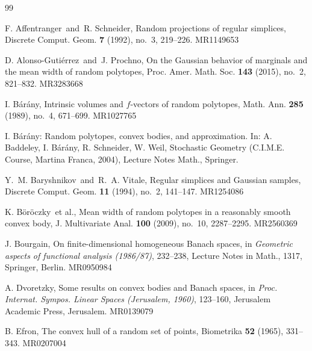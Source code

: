 \documentclass[11pt]{amsart}
\theoremstyle{definition}
\theoremstyle{plain}
\begin{document}
\begin{thebibliography}{99}

{
F. Affentranger\ and\ R. Schneider, Random projections of regular simplices, Discrete Comput. Geom. {\bf 7} (1992), no.~3, 219--226. MR1149653
}

{
D. Alonso-Guti\'{e}rrez\ and\ J. Prochno, On the Gaussian behavior of marginals and the mean width of random polytopes, Proc. Amer. Math. Soc. {\bf 143} (2015), no.~2, 821--832. MR3283668
}




{
I. B\'{a}r\'{a}ny, Intrinsic volumes and $f$-vectors of random polytopes, Math. Ann. {\bf 285} (1989), no.~4, 671--699. MR1027765
}

{
I. B\'ar\'any: Random polytopes, convex bodies, and approximation. In: A. Baddeley, I. B\'ar\'any, R. Schneider, W. Weil, Stochastic Geometry (C.I.M.E. Course, Martina Franca, 2004), Lecture Notes Math., Springer.
}

{
Y.~M. Baryshnikov\ and\ R.~A. Vitale, Regular simplices and Gaussian samples, Discrete Comput. Geom. {\bf 11} (1994), no.~2, 141--147. MR1254086
}

{
K. B\"{o}r\"{o}czky\ et al., Mean width of random polytopes in a reasonably smooth convex body, J. Multivariate Anal. {\bf 100} (2009), no.~10, 2287--2295. MR2560369
}

{
J. Bourgain, On finite-dimensional homogeneous Banach spaces, in {\it Geometric aspects of functional analysis (1986/87)}, 232--238, Lecture Notes in Math., 1317, Springer, Berlin. MR0950984
}

{
A. Dvoretzky, Some results on convex bodies and Banach spaces, in {\it Proc. Internat. Sympos. Linear Spaces (Jerusalem, 1960)}, 123--160, Jerusalem Academic Press, Jerusalem. MR0139079
}

{
B. Efron, The convex hull of a random set of points, Biometrika {\bf 52} (1965), 331--343. MR0207004
}


\end{thebibliography}
\end{document}
